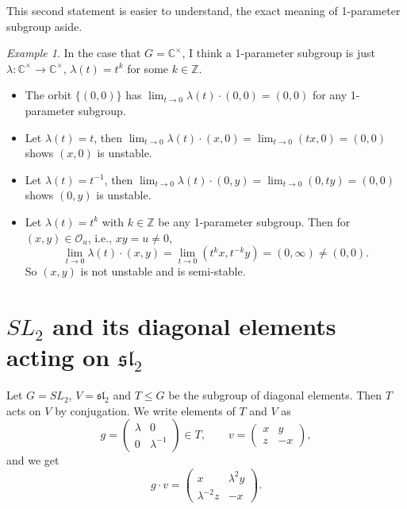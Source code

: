 \documentclass[12pt]{amsart}
\newcommand{\C}{\mathbb{C}}
\theoremstyle{remark}
\theoremstyle{remark}
\newtheorem*{example}{Example}
\begin{document}
This second statement is easier to understand, the exact meaning of 1-parameter subgroup aside.

\begin{example}
In the case that $G = \C^\times$, I think a 1-parameter subgroup is just $\lambda: \C^\times \to \C^\times$, $\lambda(t) = t^{k}$ for some $k \in \mathbb{Z}$.
\begin{itemize}[label=-]
\item
The orbit $\{(0, 0)\}$ has $\lim_{t \to 0} \lambda(t) \cdot (0, 0) = (0, 0)$ for any 1-parameter subgroup.

\item
Let $\lambda(t) = t$, then $\lim_{t \to 0} \lambda(t) \cdot (x, 0) = \lim_{t \to 0} (t x, 0) = (0, 0)$ shows $(x, 0)$ is unstable.

\item
Let $\lambda(t) = t^{-1}$, then $\lim_{t \to 0} \lambda(t) \cdot (0, y) = \lim_{t \to 0} (0, ty) = (0, 0)$ shows $(0, y)$ is unstable.

\item 
Let $\lambda(t) = t^k$ with $k \in \mathbb{Z}$ be any 1-parameter subgroup.
Then for $(x, y) \in \mathcal{O}_u$, i.e., $xy = u \ne 0$, 
$$\lim_{t \to 0} \lambda(t) \cdot (x, y) = \lim_{t \to 0} (t^k x, t^{-k} y) = (0, \infty) \ne (0, 0).$$
So $(x, y)$ is not unstable and is semi-stable.
\end{itemize}
\end{example}

\section*{$SL_2$ and its diagonal elements acting on $\mathfrak{sl}_2$}
Let $G = SL_2$, $V = \mathfrak{sl}_2$ and $T \le G$ be the subgroup of diagonal elements.
Then $T$ acts on $V$ by conjugation.
We write elements of $T$ and $V$ as
$$
g = \begin{pmatrix} \lambda & 0 \\ 0 & \lambda^{-1} \end{pmatrix} \in T,
\qquad
v = \begin{pmatrix} x & y \\ z & -x \end{pmatrix},$$
and we get
$$g \cdot v = \begin{pmatrix} x & \lambda^2 y \\ \lambda^{-2} z & -x \end{pmatrix}.$$
\end{document}
